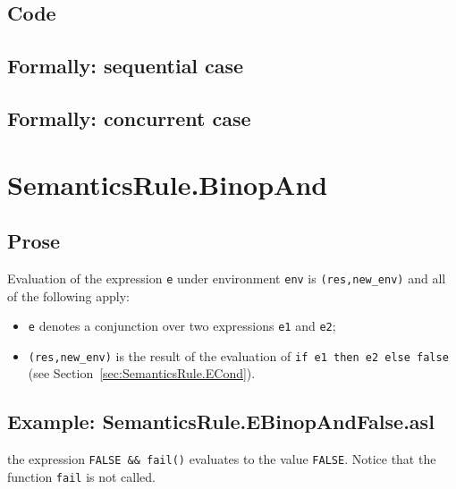 \documentclass{book}
\begin{document}
  \subsection{Code}

\begin{emptyformal}
  \subsection{Formally: sequential case}

  \subsection{Formally: concurrent case}
\end{emptyformal}


\section{SemanticsRule.BinopAnd \label{sec:SemanticsRule.BinopAnd}}

  \subsection{Prose}
  Evaluation of the expression \texttt{e} under environment \texttt{env} is
  \texttt{(res,new\_env)} and all of the following apply:
  \begin{itemize}
  \item \texttt{e} denotes a conjunction over two expressions \texttt{e1} and \texttt{e2};
  \item \texttt{(res,new\_env)} is the result of the evaluation of \texttt{if
e1 then e2 else false} (see Section~\ref{sec:SemanticsRule.ECond}).
  \end{itemize}

  \subsection{Example: SemanticsRule.EBinopAndFalse.asl}

    the expression \texttt{FALSE \&\& fail()} evaluates to the value \texttt{FALSE}. Notice that the function \texttt{fail} is not called.
\end{document}

